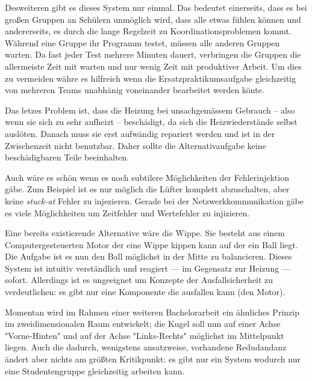 Desweiteren gibt es dieses System nur einmal. Das bedeutet einerseits, dass es bei gro{\ss}en Gruppen
an Sch{\"{u}}lern unm{\"{o}}glich wird, dass alle etwas f{\"{u}}hlen k{\"{o}}nnen und andererseits, es durch
die lange Regelzeit zu Koordinationsproblemen kommt. W{\"{a}}hrend eine Gruppe ihr Programm testet, m{\"{u}}ssen
alle anderen Gruppen warten. Da fast jeder Test mehrere Minuten dauert, verbringen die Gruppen die
allermeiste Zeit mit warten und nur wenig Zeit mit produktiver Arbeit. Um dies zu vermeiden w{\"{a}}hre es
hilfreich wenn die Ersatzpraktikumsaufgabe gleichzeitig von mehreren Teams unabh{\"{a}}nig voneinander bearbeitet
werden k{\"{o}}nte.

Das letzes Problem ist, dass die Heizung bei unsachgem{\"{a}}ssem Gebrauch -- also wenn sie sich zu sehr aufheizt --
besch{\"{a}}digt, da sich die Heizwiederst{\"{a}}nde selbst ausl{\"{o}}ten. Danach muss sie erst aufw{\"{a}}ndig
repariert werden und ist in der Zwischenzeit nicht benutzbar. Daher sollte die Alternativaufgabe keine besch{\"{a}}digbaren
Teile beeinhalten.

Auch w{\"{a}}re es sch{\"{o}}n wenn es noch subtilere M{\"{o}}glichkeiten der Fehlerinjektion g{\"{a}}be. Zum Beispiel ist
es nur m{\"{o}}glich die L{\"{u}}fter komplett abzuschalten, aber keine \textit{stuck-at} Fehler zu injezieren.
Gerade bei der Netzwerkkommunikation g{\"{a}}be es viele M{\"{o}}glichkeiten um Zeitfehler und Wertefehler zu injizieren.

Eine bereits existierende Alternative w{\"{a}}re die Wippe. Sie besteht aus einem Computergesteuerten Motor der eine
Wippe kippen kann auf der ein Ball liegt. Die Aufgabe ist es nun den Ball m{\"{o}}glichst in der Mitte zu balancieren.
Dieses System ist intuitiv verst{\"{a}}ndlich und reagiert --- im Gegensatz zur Heizung --- sofort. Allerdings ist
es ungeeignet um Konzepte der Ausfallsicherheit zu verdeutlichen: es gibt nur eine Komponente die ausfallen kann (den
Motor).

Momentan wird im Rahmen einer weiteren Bachelorarbeit ein {\"{a}}hnliches Prinzip im zweidimensionalen Raum entwickelt;
die Kugel soll nun auf einer Achse "Vorne-Hinten" und auf der Achse "Links-Rechts" m{\"{o}}glichst im Mittelpunkt liegen.
Auch die dadurch, wenigstens ansatzweise, vorhandene Redudandanz {\"{a}}ndert aber nichts am gr{\"{o}}{\ss}ten Kritikpunkt:
es gibt nur ein System wodurch nur eine Studentengruppe gleichzeitig arbeiten kann.

\clearpage
